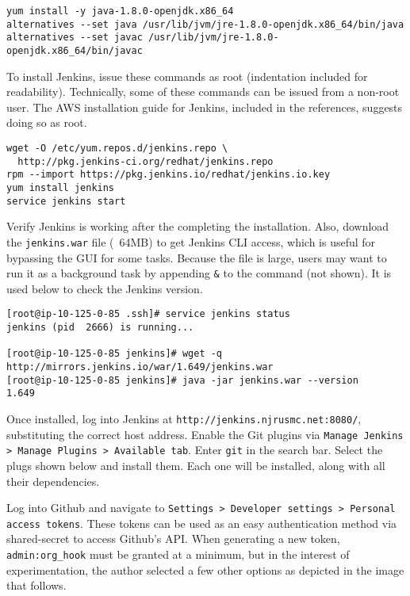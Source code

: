 \begin{verbatim}
yum install -y java-1.8.0-openjdk.x86_64
alternatives --set java /usr/lib/jvm/jre-1.8.0-openjdk.x86_64/bin/java
alternatives --set javac /usr/lib/jvm/jre-1.8.0-openjdk.x86_64/bin/javac
\end{verbatim}

To install Jenkins, issue these commands as root (indentation included for
readability). Technically, some of these commands can be issued from a
non-root user. The AWS installation guide for Jenkins, included in the
references, suggests doing so as root.

\begin{verbatim}
wget -O /etc/yum.repos.d/jenkins.repo \
  http://pkg.jenkins-ci.org/redhat/jenkins.repo
rpm --import https://pkg.jenkins.io/redhat/jenkins.io.key
yum install jenkins
service jenkins start
\end{verbatim}

Verify Jenkins is working after the completing the installation. Also,
download the \verb|jenkins.war| file (~64MB) to get Jenkins CLI access, which is
useful for bypassing the GUI for some tasks. Because the file is large, users
may want to run it as a background task by appending \verb|&| to the command
(not shown). It is used below to check the Jenkins version.

\begin{verbatim}
[root@ip-10-125-0-85 .ssh]# service jenkins status
jenkins (pid  2666) is running...

[root@ip-10-125-0-85 jenkins]# wget -q http://mirrors.jenkins.io/war/1.649/jenkins.war
[root@ip-10-125-0-85 jenkins]# java -jar jenkins.war --version
1.649
\end{verbatim}

Once installed, log into Jenkins at \verb|http://jenkins.njrusmc.net:8080/|,
substituting the correct host address. Enable the Git plugins via
\verb|Manage Jenkins > Manage Plugins > Available tab|.
Enter \verb|git| in the search bar. Select the plugs shown below and install
them. Each one will be installed, along with all their dependencies.


Log into Github and navigate to
\verb|Settings > Developer settings > Personal access tokens|. These tokens
can be used as an easy authentication method via shared-secret to access
Github's API\@. When generating a new token, \verb|admin:org_hook| must be granted at a
minimum, but in the interest of experimentation, the author selected a few
other options as depicted in the image that follows.

